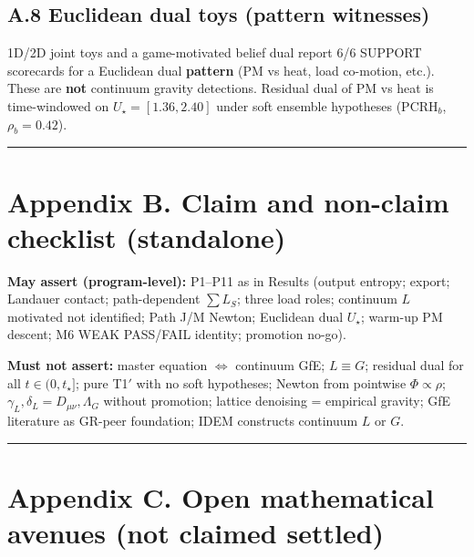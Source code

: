 \documentclass[
  11pt,
]{article}
\begin{document}
\subsection{A.8 Euclidean dual toys (pattern witnesses)}\label{a.8-euclidean-dual-toys-pattern-witnesses}

1D/2D joint toys and a game-motivated belief dual report 6/6 SUPPORT scorecards for a Euclidean dual \textbf{pattern} (PM vs heat, load co-motion, etc.). These are \textbf{not} continuum gravity detections. Residual dual of PM vs heat is time-windowed on \(U_\star=[1.36,2.40]\) under soft ensemble hypotheses (PCRH\(_b\), \(\rho_b=0.42\)).

\begin{center}\rule{0.5\linewidth}{0.5pt}\end{center}

\section{Appendix B. Claim and non-claim checklist (standalone)}\label{appendix-b.-claim-and-non-claim-checklist-standalone}

\textbf{May assert (program-level):} P1--P11 as in Results (output entropy; export; Landauer contact; path-dependent \(\sum L_S\); three load roles; continuum \(L\) motivated not identified; Path J/M Newton; Euclidean dual \(U_\star\); warm-up PM descent; M6 WEAK PASS/FAIL identity; promotion no-go).

\textbf{Must not assert:} master equation \(\Leftrightarrow\) continuum GfE; \(L\equiv G\); residual dual for all \(t\in(0,t_\star]\); pure T1\('\) with no soft hypotheses; Newton from pointwise \(\Phi\propto\rho\); \(\gamma_L,\delta_L=D_{\mu\nu},\Lambda_G\) without promotion; lattice denoising = empirical gravity; GfE literature as GR-peer foundation; IDEM constructs continuum \(L\) or \(G\).

\begin{center}\rule{0.5\linewidth}{0.5pt}\end{center}

\section{Appendix C. Open mathematical avenues (not claimed settled)}\label{appendix-c.-open-mathematical-avenues-not-claimed-settled}
\end{document}
